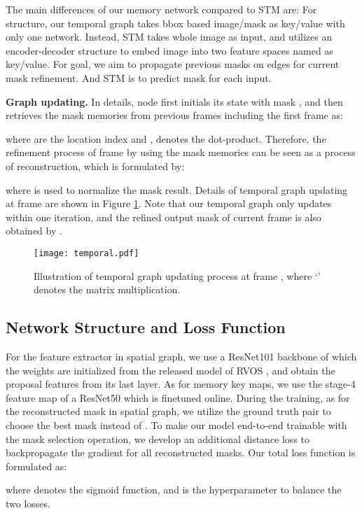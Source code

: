\documentclass[letterpaper]{article} \usepackage{aaai21}  \usepackage{times}  \usepackage{helvet} \usepackage{courier}  \usepackage[hyphens]{url}  \usepackage{graphicx} \urlstyle{rm} \def\UrlFont{\rm}  \usepackage{graphicx}  \usepackage{natbib}  \usepackage{caption} \frenchspacing  \setlength{\pdfpagewidth}{8.5in}  \setlength{\pdfpageheight}{11in}  \usepackage{amsmath}
\begin{document}
The main differences of our memory network compared to STM \cite{oh2019video} are:
For structure, our temporal graph takes bbox based image/mask as key/value with only one network. Instead, STM takes whole image as input, and utilizes an encoder-decoder structure to embed image into two feature spaces named as key/value. For goal, we aim to propagate previous masks on edges for current mask refinement. And STM is to predict mask for each input.

\noindent \textbf{Graph updating.}
In details, node  first initials its state  with mask , and then retrieves the mask memories from previous  frames including the first frame  as:

where  are the location index and ,  denotes the dot-product. Therefore, the refinement process of frame  by using the mask memories can be seen as a process of reconstruction, which is formulated by:

where  is used to normalize the mask result. Details of temporal graph updating at frame  are shown in Figure \ref{fig:temporal}. Note that our temporal graph only updates within one iteration, and the refined output mask  of current frame is also obtained by .

\begin{figure}[t]
\centering
\texttt{[image: temporal.pdf]}
\caption{Illustration of temporal graph updating process at frame , where `' denotes the matrix multiplication.}
\label{fig:temporal}
\vspace{-10pt}
\end{figure}

\subsection{Network Structure and Loss Function}
For the feature extractor in spatial graph, we use a ResNet101 backbone of which the weights are initialized from the released model of RVOS \cite{ventura2019rvos}, and obtain the proposal features from its last layer. As for memory key maps, we use the stage-4 feature map of a ResNet50 which is finetuned online. During the training, as for the reconstructed mask  in spatial graph, we utilize the ground truth pair  to choose the best mask instead of . To make our model end-to-end trainable with the mask selection operation, we develop an additional distance loss to backpropagate the gradient for all reconstructed masks. Our total loss function  is formulated as:

where  denotes the sigmoid function, and  is the hyperparameter to balance the two losses. 
\end{document}
